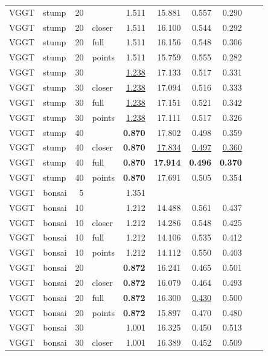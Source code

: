 \begin{table}[H]
\begin{tabular}{llrlrrrrrr}
VGGT & stump & 20 &  & 1.511 & 15.881 & 0.557 & 0.290 &  &  \\
VGGT & stump & 20 & closer & 1.511 & 16.100 & 0.544 & 0.292 &  &  \\
VGGT & stump & 20 & full & 1.511 & 16.156 & 0.548 & 0.306 &  &  \\
VGGT & stump & 20 & points & 1.511 & 15.759 & 0.555 & 0.282 &  &  \\
VGGT & stump & 30 &  & \underline{1.238} & 17.133 & 0.517 & 0.331 &  &  \\
VGGT & stump & 30 & closer & \underline{1.238} & 17.094 & 0.516 & 0.333 &  &  \\
VGGT & stump & 30 & full & \underline{1.238} & 17.151 & 0.521 & 0.342 &  &  \\
VGGT & stump & 30 & points & \underline{1.238} & 17.111 & 0.517 & 0.326 &  &  \\
VGGT & stump & 40 &  & \textbf{0.870} & 17.802 & 0.498 & 0.359 &  &  \\
VGGT & stump & 40 & closer & \textbf{0.870} & \underline{17.834} & \underline{0.497} & \underline{0.360} &  &  \\
VGGT & stump & 40 & full & \textbf{0.870} & \textbf{17.914} & \textbf{0.496} & \textbf{0.370} &  &  \\
VGGT & stump & 40 & points & \textbf{0.870} & 17.691 & 0.505 & 0.354 &  &  \\
\midrule
VGGT & bonsai & 5 &  & 1.351 &  &  &  &  &  \\
VGGT & bonsai & 10 &  & 1.212 & 14.488 & 0.561 & 0.437 &  &  \\
VGGT & bonsai & 10 & closer & 1.212 & 14.286 & 0.548 & 0.425 &  &  \\
VGGT & bonsai & 10 & full & 1.212 & 14.106 & 0.535 & 0.412 &  &  \\
VGGT & bonsai & 10 & points & 1.212 & 14.112 & 0.550 & 0.403 &  &  \\
VGGT & bonsai & 20 &  & \textbf{0.872} & 16.241 & 0.465 & 0.501 &  &  \\
VGGT & bonsai & 20 & closer & \textbf{0.872} & 16.079 & 0.464 & 0.493 &  &  \\
VGGT & bonsai & 20 & full & \textbf{0.872} & 16.300 & \underline{0.430} & 0.500 &  &  \\
VGGT & bonsai & 20 & points & \textbf{0.872} & 15.897 & 0.470 & 0.480 &  &  \\
VGGT & bonsai & 30 &  & 1.001 & 16.325 & 0.450 & 0.513 &  &  \\
VGGT & bonsai & 30 & closer & 1.001 & 16.389 & 0.452 & 0.509 &  &  \\

\end{tabular}
\end{table}
